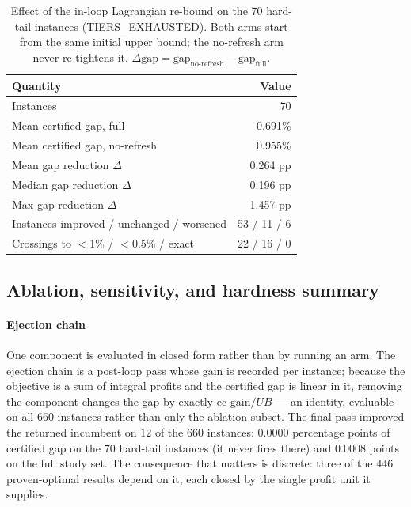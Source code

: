 \documentclass[preprint,12pt]{elsarticle}
\begin{document}
\begin{table}[t]
\centering
\caption{Effect of the in-loop Lagrangian re-bound on the 70 hard-tail instances (TIERS\_EXHAUSTED). Both arms start from the same initial upper bound; the no-refresh arm never re-tightens it. $\Delta\text{gap}=\text{gap}_{\text{no-refresh}}-\text{gap}_{\text{full}}$.}
\label{tab:hardtail-refresh}
\begin{tabular}{lr}
\hline
Quantity & Value \\
\hline
Instances & 70 \\
Mean certified gap, full & 0.691\% \\
Mean certified gap, no-refresh & 0.955\% \\
Mean gap reduction $\Delta$ & 0.264 pp \\
Median gap reduction $\Delta$ & 0.196 pp \\
Max gap reduction $\Delta$ & 1.457 pp \\
Instances improved / unchanged / worsened & 53 / 11 / 6 \\
Crossings to $<$1\% / $<$0.5\% / exact & 22 / 16 / 0 \\
\hline
\end{tabular}
\end{table}

\subsection{Ablation, sensitivity, and hardness summary}

\paragraph{Ejection chain} One component is evaluated in closed form rather than by running an arm. The ejection chain is a post-loop pass whose gain is recorded per instance; because the objective is a sum of integral profits and the certified gap is linear in it, removing the component changes the gap by exactly $\text{ec\_gain}/UB$ --- an identity, evaluable on all $660$ instances rather than only the ablation subset. The final pass improved the returned incumbent on $12$ of the $660$ instances: $0.0000$ percentage points of certified gap on the $70$ hard-tail instances (it never fires there) and $0.0008$ points on the full study set. The consequence that matters is discrete: three of the $446$ proven-optimal results depend on it, each closed by the single profit unit it supplies.
\end{document}
